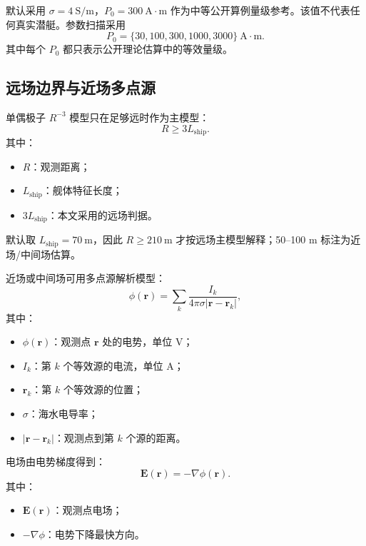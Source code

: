 默认采用 $\sigma=4\ \mathrm{S/m}$，$P_0=300\ \mathrm{A\cdot m}$ 作为中等公开算例量级参考。该值不代表任何真实潜艇。参数扫描采用
\begin{equation}
    P_0=\{30,100,300,1000,3000\}\ \mathrm{A\cdot m}.
\end{equation}
其中每个 $P_0$ 都只表示公开理论估算中的等效量级。

\subsection{远场边界与近场多点源}

单偶极子 $R^{-3}$ 模型只在足够远时作为主模型：
\begin{equation}
    R\ge 3L_{\mathrm{ship}}.
\end{equation}
其中：
\begin{itemize}
    \item $R$：观测距离；
    \item $L_{\mathrm{ship}}$：舰体特征长度；
    \item $3L_{\mathrm{ship}}$：本文采用的远场判据。
\end{itemize}

默认取 $L_{\mathrm{ship}}=70\ \mathrm{m}$，因此 $R\ge210\ \mathrm{m}$ 才按远场主模型解释；50--100 m 标注为近场/中间场估算。

近场或中间场可用多点源解析模型：
\begin{equation}
    \phi(\bm r)=\sum_k \frac{I_k}{4\pi\sigma|\bm r-\bm r_k|},
    \label{eq:multipoint_phi}
\end{equation}
其中：
\begin{itemize}
    \item $\phi(\bm r)$：观测点 $\bm r$ 处的电势，单位 $\mathrm{V}$；
    \item $I_k$：第 $k$ 个等效源的电流，单位 $\mathrm{A}$；
    \item $\bm r_k$：第 $k$ 个等效源的位置；
    \item $\sigma$：海水电导率；
    \item $|\bm r-\bm r_k|$：观测点到第 $k$ 个源的距离。
\end{itemize}

电场由电势梯度得到：
\begin{equation}
    \bm E(\bm r)=-\nabla \phi(\bm r).
    \label{eq:multipoint_E}
\end{equation}
其中：
\begin{itemize}
    \item $\bm E(\bm r)$：观测点电场；
    \item $-\nabla\phi$：电势下降最快方向。
\end{itemize}


